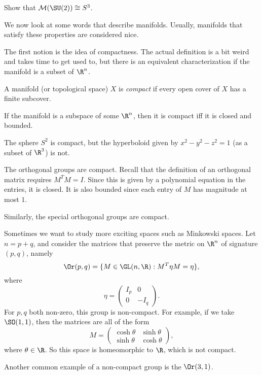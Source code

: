\documentclass[a4paper]{article}
\begin{document}
\begin{ex}
  Show that $\mathcal{M}(\SU(2)) \cong S^3$.
\end{ex}

We now look at some words that describe manifolds. Usually, manifolds that satisfy these properties are considered nice.

The first notion is the idea of compactness. The actual definition is a bit weird and takes time to get used to, but there is an equivalent characterization if the manifold is a subset of $\R^n$.
\begin{defi}[Compact]
  A manifold (or topological space) $X$ is \emph{compact} if every open cover of $X$ has a finite subcover.

  If the manifold is a subspace of some $\R^n$, then it is compact iff it is closed and bounded.
\end{defi}

\begin{eg}
  The sphere $S^2$ is compact, but the hyperboloid given by $x^2 - y^2 - z^2 = 1$ (as a subset of $\R^3$) is not.
\end{eg}

\begin{eg}
  The orthogonal groups are compact. Recall that the definition of an orthogonal matrix requires $M^T M = I$. Since this is given by a polynomial equation in the entries, it is closed. It is also bounded since each entry of $M$ has magnitude at most $1$.

  Similarly, the special orthogonal groups are compact.
\end{eg}

\begin{eg}
  Sometimes we want to study more exciting spaces such as Minkowski spaces. Let $n = p + q$, and consider the matrices that preserve the metric on $\R^n$ of signature $(p, q)$, namely
  \[
    \Or(p, q) = \{M \in \GL(n, \R): M^T \eta M = \eta\},
  \]
  where
  \[
    \eta =
    \begin{pmatrix}
      I_p & 0\\
      0 & -I_q
    \end{pmatrix}.
  \]
  For $p, q$ both non-zero, this group is non-compact. For example, if we take $\SO(1, 1)$, then the matrices are all of the form
  \[
    M =
    \begin{pmatrix}
      \cosh\theta & \sinh \theta\\
      \sinh \theta & \cosh \theta
    \end{pmatrix},
  \]
  where $\theta \in \R$. So this space is homeomorphic to $\R$, which is not compact.

  Another common example of a non-compact group is the  $\Or(3, 1)$.
\end{eg}
\end{document}
